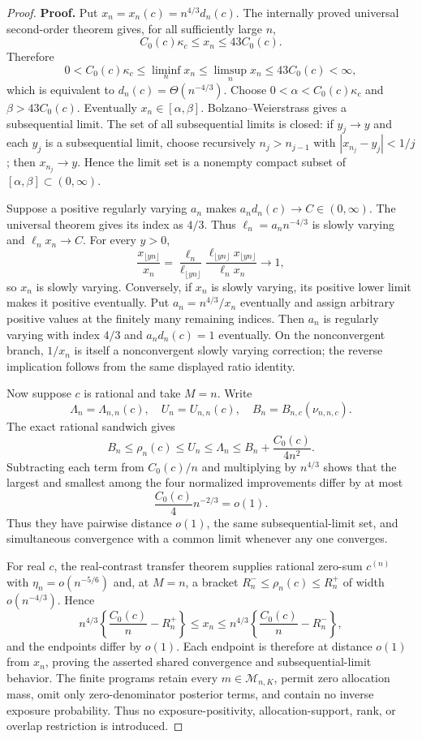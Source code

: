 \documentclass{article}
\begin{document}
\begin{proof}
\textbf{Proof.}
Put \(x_n=x_n(c)=n^{4/3}d_n(c)\). The internally proved universal second-order theorem gives, for all sufficiently large \(n\),
\[
 C_0(c)\kappa_c\leq x_n\leq43C_0(c).
\]
Therefore
\[
 0<C_0(c)\kappa_c
 \leq\liminf_nx_n\leq\limsup_nx_n\leq43C_0(c)<\infty,
\]
which is equivalent to \(d_n(c)=\Theta(n^{-4/3})\). Choose \(0<\alpha<C_0(c)\kappa_c\) and \(\beta>43C_0(c)\). Eventually \(x_n\in[\alpha,\beta]\). Bolzano--Weierstrass gives a subsequential limit. The set of all subsequential limits is closed: if \(y_j\to y\) and each \(y_j\) is a subsequential limit, choose recursively \(n_j>n_{j-1}\) with \(|x_{n_j}-y_j|<1/j\); then \(x_{n_j}\to y\). Hence the limit set is a nonempty compact subset of \([\alpha,\beta]\subset(0,\infty)\).

Suppose a positive regularly varying \(a_n\) makes \(a_nd_n(c)\to C\in(0,\infty)\). The universal theorem gives its index as \(4/3\). Thus \(\ell_n=a_nn^{-4/3}\) is slowly varying and \(\ell_nx_n\to C\). For every \(y>0\),
\[
 \frac{x_{\lfloor yn\rfloor}}{x_n}
 =\frac{\ell_n}{\ell_{\lfloor yn\rfloor}}
 \frac{\ell_{\lfloor yn\rfloor}x_{\lfloor yn\rfloor}}{\ell_nx_n}
 \longrightarrow1,
\]
so \(x_n\) is slowly varying. Conversely, if \(x_n\) is slowly varying, its positive lower limit makes it positive eventually. Put \(a_n=n^{4/3}/x_n\) eventually and assign arbitrary positive values at the finitely many remaining indices. Then \(a_n\) is regularly varying with index \(4/3\) and \(a_nd_n(c)=1\) eventually. On the nonconvergent branch, \(1/x_n\) is itself a nonconvergent slowly varying correction; the reverse implication follows from the same displayed ratio identity.

Now suppose \(c\) is rational and take \(M=n\). Write
\[
 \Lambda_n=\Lambda_{n,n}(c),\quad U_n=U_{n,n}(c),\quad
 B_n=B_{n,c}(\nu_{n,n,c}).
\]
The exact rational sandwich gives
\[
 B_n\leq\rho_n(c)\leq U_n\leq\Lambda_n
 \leq B_n+\frac{C_0(c)}{4n^2}.
\]
Subtracting each term from \(C_0(c)/n\) and multiplying by \(n^{4/3}\) shows that the largest and smallest among the four normalized improvements differ by at most
\[
 \frac{C_0(c)}4n^{-2/3}=o(1).
\]
Thus they have pairwise distance \(o(1)\), the same subsequential-limit set, and simultaneous convergence with a common limit whenever any one converges.

For real \(c\), the real-contrast transfer theorem supplies rational zero-sum \(c^{(n)}\) with \(\eta_n=o(n^{-5/6})\) and, at \(M=n\), a bracket \(R_n^-\leq\rho_n(c)\leq R_n^+\) of width \(o(n^{-4/3})\). Hence
\[
 n^{4/3}\left\{\frac{C_0(c)}n-R_n^+\right\}
 \leq x_n\leq
 n^{4/3}\left\{\frac{C_0(c)}n-R_n^-\right\},
\]
and the endpoints differ by \(o(1)\). Each endpoint is therefore at distance \(o(1)\) from \(x_n\), proving the asserted shared convergence and subsequential-limit behavior. The finite programs retain every \(m\in\mathcal M_{n,K}\), permit zero allocation mass, omit only zero-denominator posterior terms, and contain no inverse exposure probability. Thus no exposure-positivity, allocation-support, rank, or overlap restriction is introduced.


\end{proof}
\end{document}
